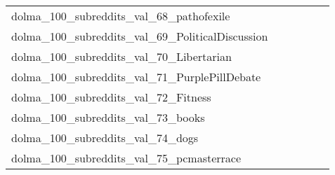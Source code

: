 {\begin{longtable}{m{6cm}m{1.7cm}m{1.7cm}m{1.7cm}m{1.7cm}m{1.7cm}}
	dolma\_100\_subreddits\_val\_68\_pathofexile  & \colorbox[HTML]{ffffe5}{\makebox[\mywidth][c]{40.48}} & \colorbox[HTML]{aadc8d}{\makebox[\mywidth][c]{38.59}} & \colorbox[HTML]{ffffe5}{\makebox[\mywidth][c]{41.43}} & \colorbox[HTML]{ceeb9e}{\makebox[\mywidth][c]{38.75}} & \colorbox[HTML]{77c578}{\makebox[\mywidth][c]{38.43}}\\
	dolma\_100\_subreddits\_val\_69\_PoliticalDiscussion  & \colorbox[HTML]{ffffe5}{\makebox[\mywidth][c]{20.01}} & \colorbox[HTML]{b8e293}{\makebox[\mywidth][c]{18.92}} & \colorbox[HTML]{ffffe5}{\makebox[\mywidth][c]{20.16}} & \colorbox[HTML]{d1ec9f}{\makebox[\mywidth][c]{18.97}} & \colorbox[HTML]{77c578}{\makebox[\mywidth][c]{18.82}}\\
	dolma\_100\_subreddits\_val\_70\_Libertarian  & \colorbox[HTML]{ffffe5}{\makebox[\mywidth][c]{22.97}} & \colorbox[HTML]{86cc7e}{\makebox[\mywidth][c]{21.77}} & \colorbox[HTML]{ffffe5}{\makebox[\mywidth][c]{23.15}} & \colorbox[HTML]{c1e597}{\makebox[\mywidth][c]{21.87}} & \colorbox[HTML]{77c578}{\makebox[\mywidth][c]{21.75}}\\
	dolma\_100\_subreddits\_val\_71\_PurplePillDebate  & \colorbox[HTML]{ffffe5}{\makebox[\mywidth][c]{24.94}} & \colorbox[HTML]{b0de8f}{\makebox[\mywidth][c]{23.66}} & \colorbox[HTML]{ffffe5}{\makebox[\mywidth][c]{25.44}} & \colorbox[HTML]{e2f3a9}{\makebox[\mywidth][c]{23.85}} & \colorbox[HTML]{77c578}{\makebox[\mywidth][c]{23.55}}\\
	dolma\_100\_subreddits\_val\_72\_Fitness  & \colorbox[HTML]{ffffe5}{\makebox[\mywidth][c]{21.57}} & \colorbox[HTML]{e5f4ab}{\makebox[\mywidth][c]{20.35}} & \colorbox[HTML]{ffffe5}{\makebox[\mywidth][c]{21.48}} & \colorbox[HTML]{e1f3a9}{\makebox[\mywidth][c]{20.34}} & \colorbox[HTML]{77c578}{\makebox[\mywidth][c]{20.11}}\\
	dolma\_100\_subreddits\_val\_73\_books  & \colorbox[HTML]{ffffe5}{\makebox[\mywidth][c]{21.12}} & \colorbox[HTML]{dbf1a4}{\makebox[\mywidth][c]{20.02}} & \colorbox[HTML]{ffffe5}{\makebox[\mywidth][c]{21.31}} & \colorbox[HTML]{e8f6ae}{\makebox[\mywidth][c]{20.09}} & \colorbox[HTML]{77c578}{\makebox[\mywidth][c]{19.82}}\\
	dolma\_100\_subreddits\_val\_74\_dogs  & \colorbox[HTML]{ffffe5}{\makebox[\mywidth][c]{20.13}} & \colorbox[HTML]{def2a6}{\makebox[\mywidth][c]{19.12}} & \colorbox[HTML]{ffffe5}{\makebox[\mywidth][c]{20.32}} & \colorbox[HTML]{edf8b2}{\makebox[\mywidth][c]{19.20}} & \colorbox[HTML]{77c578}{\makebox[\mywidth][c]{18.92}}\\
	dolma\_100\_subreddits\_val\_75\_pcmasterrace  & \colorbox[HTML]{ffffe5}{\makebox[\mywidth][c]{23.73}} & \colorbox[HTML]{e2f3a9}{\makebox[\mywidth][c]{22.49}} & \colorbox[HTML]{ffffe5}{\makebox[\mywidth][c]{24.02}} & \colorbox[HTML]{edf8b2}{\makebox[\mywidth][c]{22.56}} & \colorbox[HTML]{77c578}{\makebox[\mywidth][c]{22.21}}\\

\end{longtable}}

